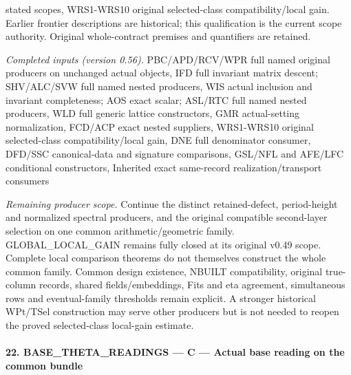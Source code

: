 stated scopes, WRS1-WRS10 original selected-class compatibility/local gain. Earlier frontier descriptions are historical; this qualification is the current scope authority. Original whole-contract premises and quantifiers are retained.

\emph{Completed inputs (version 0.56).} PBC/APD/RCV/WPR full named original producers on unchanged actual objects, IFD full invariant matrix descent; SHV/ALC/SVW full named nested producers, WIS actual inclusion and invariant completeness; AOS exact scalar; ASL/RTC full named nested producers, WLD full generic lattice constructors, GMR actual-setting normalization, FCD/ACP exact nested suppliers, WRS1-WRS10 original selected-class compatibility/local gain, DNE full denominator consumer, DFD/SSC canonical-data and signature comparisons, GSL/NFL and AFE/LFC conditional constructors, Inherited exact same-record realization/transport consumers

\emph{Remaining producer scope.} Continue the distinct retained-defect, period-height and normalized spectral producers, and the original compatible second-layer selection on one common arithmetic/geometric family. GLOBAL\_\allowbreak LOCAL\_\allowbreak GAIN remains fully closed at its original v0.49 scope. Complete local comparison theorems do not themselves construct the whole common family. Common design existence, NBUILT compatibility, original true-column records, shared fields/embeddings, Fits and eta agreement, simultaneous rows and eventual-family thresholds remain explicit. A stronger historical WPt/TSel construction may serve other producers but is not needed to reopen the proved selected-class local-gain estimate.



\paragraph{22. BASE\_\allowbreak THETA\_\allowbreak READINGS — C — Actual base reading on the common bundle}


